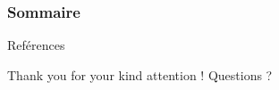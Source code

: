 \documentclass[notes,handout]{beamer}
\begin{document}
\begin{frame}
  \frametitle{Sommaire}
  \tableofcontents
\end{frame}




% 

% 

% 

% 




\appendix   %


\begin{frame}[plain,t]{Reférences}
  \tiny
  \printbibliography
\end{frame}


  \begin{frame}[plain]
    \Large
    \begin{exampleblock}{\centering \LARGE Thank you for your kind attention \Large \Smiley{} !}\LARGE
      \centering
      Questions ?
    \end{exampleblock}

  \end{frame}
\end{document}
